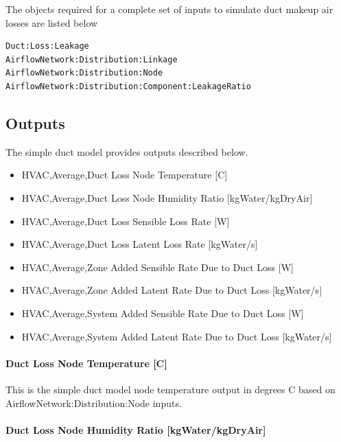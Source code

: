 The objects required for a complete set of inputs to simulate duct makeup air losses are listed below

\begin{lstlisting}
Duct:Loss:Leakage
AirflowNetwork:Distribution:Linkage
AirflowNetwork:Distribution:Node
AirflowNetwork:Distribution:Component:LeakageRatio

\end{lstlisting}


\subsection{Outputs}\label{outputs-simple-duct-model}

The simple duct model provides outputs described below.

\begin{itemize}
\item
  HVAC,Average,Duct Loss Node Temperature {[}C{]}
\item
  HVAC,Average,Duct Loss Node Humidity Ratio {[}kgWater/kgDryAir{]}
\item
  HVAC,Average,Duct Loss Sensible Loss Rate {[}W{]}
\item
  HVAC,Average,Duct Loss Latent Loss Rate {[}kgWater/s{]}
\item
  HVAC,Average,Zone Added Sensible Rate Due to Duct Loss {[}W{]}
\item
  HVAC,Average,Zone Added Latent Rate Due to Duct Loss {[}kgWater/s{]}
\item
  HVAC,Average,System Added Sensible Rate Due to Duct Loss {[}W{]}
\item
  HVAC,Average,System Added Latent Rate Due to Duct Loss {[}kgWater/s{]}
\end{itemize}

\paragraph{Duct Loss Node Temperature {[}C{]}}\label{duct-loss--node-temperature-c}

This is the simple duct model node temperature output in degrees C based on AirflowNetwork:Distribution:Node inputs.

\paragraph{Duct Loss Node Humidity Ratio {[}kgWater/kgDryAir{]}}\label{duct-loss-node-humidity-ratio-kgwaterkgdryair}

